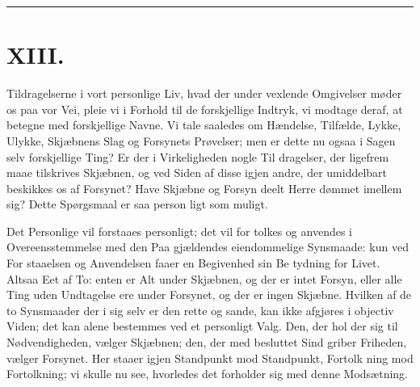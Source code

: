 \documentclass[12pt]{book}
\newcommand{\opage}[1]{\marginnote{\footnotesize\textit{[#1]}}}
\begin{document}
\begin{center}\rule{3cm}{0.4pt}\end{center}

\chapter*{XIII.}
\label{ch:xiii}
\opage{208}\setcounter{footnote}{0}%
Tildragelserne i vort personlige Liv, hvad der under
vexlende Omgivelser møder os paa vor Vei, pleie vi i
Forhold til de forskjellige Indtryk, vi modtage deraf, at
betegne med forskjellige Navne. Vi tale saaledes om
Hændelse, Tilfælde, Lykke, Ulykke, Skjæbnens Slag og
Forsynets Prøvelser; men er dette nu ogsaa i Sagen selv
forskjellige Ting? Er der i Virkeligheden nogle Til\-%
dragelser, der ligefrem maae tilskrives Skjæbnen, og ved
Siden af disse igjen andre, der umiddelbart beskikkes os
af Forsynet? Have Skjæbne og Forsyn deelt Herre\-%
dømmet imellem sig? Dette Spørgsmaal er saa person\-%
ligt som muligt.

Det Personlige vil forstaaes personligt; det vil for\-%
tolkes og anvendes i Overeensstemmelse med den Paa\-%
gjældendes eiendommelige Synsmaade: kun ved For\-%
staaelsen og Anvendelsen faaer en Begivenhed sin Be\-%
tydning for Livet. Altsaa Eet af To: enten er Alt under
Skjæbnen, og der er intet Forsyn, eller alle Ting uden
Undtagelse ere under Forsynet, og der er ingen Skjæbne.
Hvilken af de to Synsmaader der i sig selv er den rette
og sande, kan ikke afgjøres i objectiv Viden; det kan
alene bestemmes ved et personligt Valg. Den, der hol\-%
der sig til Nødvendigheden, vælger Skjæbnen; den, der
\opage{209}\setcounter{footnote}{0}%
med besluttet Sind griber Friheden, vælger Forsynet.
Her staaer igjen Standpunkt mod Standpunkt, Fortolk\-%
ning mod Fortolkning; vi skulle nu see, hvorledes det
forholder sig med denne Modsætning.
\end{document}
